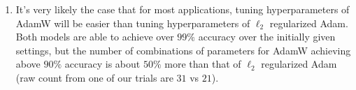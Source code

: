 \begin{enumerate}[(a)]
{\begin{enumerate}
    \item{
        It's very likely the case that for most applications, tuning hyperparameters of AdamW will be easier than tuning hyperparameters of $\ell_2$ regularized Adam. Both models are able to achieve over $99\%$ accuracy over the initially given  settings, but the number of combinations of parameters for AdamW achieving above $90\%$ accuracy is about $50\%$ more than that of $\ell_2$ regularized Adam (raw count from one of our trials are $31$ vs $21$).
        }
\end{enumerate}
}

\end{enumerate}

